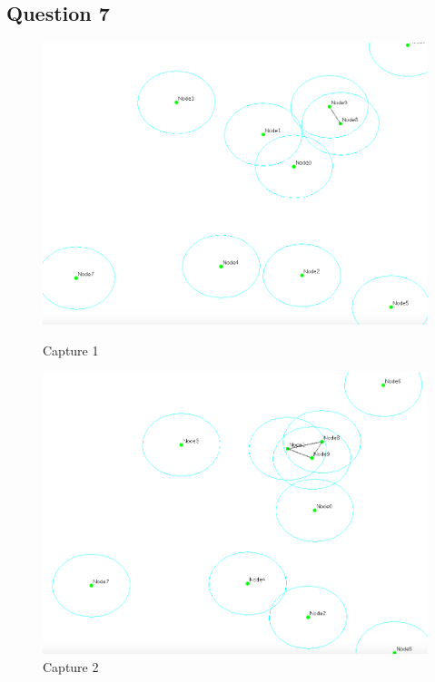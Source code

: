 \documentclass[10pt]{report}
\begin{document}
\subsection{Question 7}

\begin{figure}[H]
\centering
\begin{minipage}{0.3\textwidth} \begin{flushleft}
\includegraphics[height = 0.2\textheight,width = .8\textwidth]{imgs/2.png}
 		\caption[cap1]{Capture 1}
        \label{fig:Capture 1}
\end{flushleft}\end{minipage}
\begin{minipage}{0.3\textwidth} \begin{center}
\includegraphics[height = 0.2\textheight,width = .8\textwidth]{imgs/3.png}
 		\caption[cap2]{Capture 2}
        \label{fig:Capture 2}
\end{center}\end{minipage}
\begin{minipage}{0.3\textwidth} \begin{flushright}

\end{flushright}
\end{minipage}
\end{figure}
\end{document}
